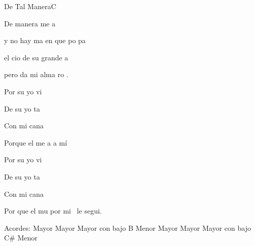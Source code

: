 \documentclass[12pt, spanish]{book}
\begin{document}
\begin{song}{De Tal Manera}{C}

        \begin{SBOpGroup}
            De  manera me a

            y no hay ma en que po pa

            el cio de su grande a

            pero da mi alma ro .
        \end{SBOpGroup}

        \begin{SBChorus}
            Por su  yo vi

            De su  yo ta

            Con mi  cana

            Porque el me a a mí

            Por su  yo vi

            De su  yo ta

            Con mi  cana

            Por que el mu por mi~ le segui.
        \end{SBChorus}

        \ifChordBk
        \begin{SBOpGroup}
            Acordes:
             Mayor \hfill
             Mayor \hfill\null\break
             Mayor \hfill
             con bajo B \hfill\null\break
             Menor \hfill
             Mayor \hfill\null\break
             Mayor \hfill
             Mayor con bajo C\# \hfill\null\break
             Menor \hfill\null\break
        \end{SBOpGroup}
        \fi
    \end{song}
\end{document}
